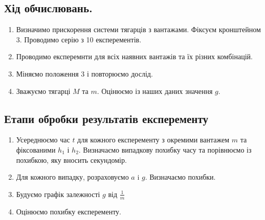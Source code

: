 \documentclass[a4paper,12pt]{article}
\begin{document}
\subsection{Хід обчислювань. }
	\begin{enumerate}
		\item Визначимо прискорення системи тягарців з вантажами. Фіксуєм кронштейном 3. Проводимо серію з 10 експерементів.
		\item Проводимо експеремнти для всіх наявних вантажів та їх різних комбінацій.
		\item Міняємо положення 3 і повторюємо дослід.
		\item Зважуємо тягарці $M$ та $m$. Оцінюємо із наших даних значення $g$. 
	\end{enumerate}
\subsection{Етапи обробки результатів експеременту}
\begin{enumerate}
	\item Усереднюємо час $t$ для кожного експеременту з окремими вантажем $m$ та фіксованими $h_1$ і $h_2$. Визначаємо випадкову похибку часу та порівнюємо із похибкою, яку вносить секундомір. 
	\item Для кожного випадку, розраховуємо $a$ i $g$. Визначаємо похибки.
	\item Будуємо графік залежності $g$ від $\frac1m$
	\item Оцінюємо похибку експеременту.
\end{enumerate}
\newpage
\end{document}
